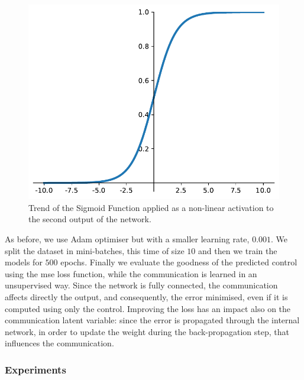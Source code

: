\begin{figure}[!htb]
	\centering
	\includegraphics[width=.5\textwidth]{contents/images/sigmoid2}%
	\caption[Trend of the Sigmoid activation function.]{Trend of the Sigmoid 
	Function applied as a non-linear activation to the second output of the 
	network.}
	\label{fig:sigmoid}
\end{figure}

As before, we use Adam optimiser but with a smaller learning rate, $0.001$. 
We split the dataset in mini-batches, this time of size $10$ and then we train 
the models for $500$ epochs. 
Finally we evaluate the goodness of the predicted control using the \gls{mse} 
loss function, while the communication is learned in an unsupervised way.
Since the network is fully connected, the communication affects directly the 
output, and consequently, the error minimised, even if it is computed using 
only the control. Improving the loss has an impact also on the 
communication latent variable: since the error is propagated through the 
internal network, in order to update the weight during the back-propagation 
step, that influences the communication.

\subsubsection{Experiments}
\label{subsubsec:expcomm}

